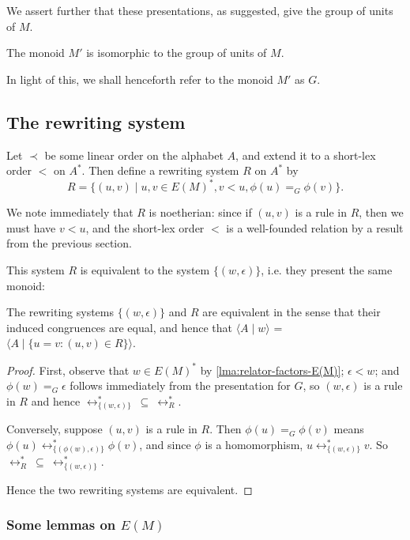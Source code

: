 \documentclass[noindex,noinsetproof,12pt]{lmaths}
\begin{document}
We assert further that these presentations, as suggested, give the group of units of $M$.

\begin{theorem}
	The monoid $M'$ is isomorphic to the group of units of $M$.
\end{theorem}

In light of this, we shall henceforth refer to the monoid $M'$ as $G$.

\subsection{The rewriting system}

Let $\prec$ be some linear order on the alphabet $A$, and extend it to a short-lex order $<$ on $A^*$. Then define a rewriting system $R$ on $A^*$ by
	\[ R = \{ (u, v) \mid u, v \in E(M)^*, v < u, \phi(u) =_G \phi(v) \}. \]

We note immediately that $R$ is noetherian: since if $(u, v)$ is a rule in $R$, then we must have $v < u$, and the short-lex order $<$ is a well-founded relation by a result from the previous section.

This system $R$ is equivalent to the system $\{(w, \epsilon)\}$, i.e. they present the same monoid:
\begin{lemma} \label{lma:R-equivalent-to-pres}
	The rewriting systems $\{(w, \epsilon)\}$ and $R$ are equivalent in the sense that their induced congruences  are equal, and hence that $\langle A \mid w \rangle$ = $\langle A \mid \{u = v : (u, v) \in R\}\rangle$.
\end{lemma}
\begin{proof}
	First, observe that $w \in E(M)^*$ by \cref{lma:relator-factors-E(M)}; $\epsilon < w$; and $\phi(w) =_G \epsilon$ follows immediately from the presentation for $G$, so $(w, \epsilon)$ is a rule in $R$ and hence $\leftrightarrow^*_{\{(w,\epsilon)\}}\ \subseteq\ \leftrightarrow^*_R$.

Conversely, suppose $(u, v)$ is a rule in $R$. Then $\phi(u) =_G \phi(v)$ means $\phi(u) \leftrightarrow^*_{\{(\phi(w), \epsilon)\}} \phi(v)$, and since $\phi$ is a homomorphism, $u \leftrightarrow^*_{\{(w, \epsilon)\}} v$. So $\leftrightarrow^*_R\ \subseteq\ \leftrightarrow^*_{\{(w,\epsilon)\}}$.

Hence the two rewriting systems are equivalent.
\end{proof}


\subsubsection{\texorpdfstring{Some lemmas on $E(M)$}{Some lemmas on E(M)}}
\end{document}
